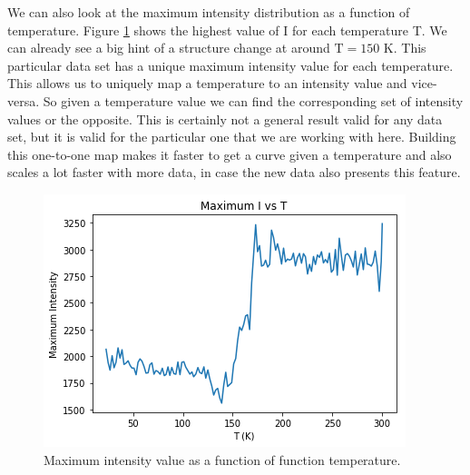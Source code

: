 We can also look at the maximum intensity distribution as a function of temperature. Figure \ref{fig:maxI} shows the highest value of I for each temperature T. We can already see a big hint of a structure change at around $\textrm{T} = 150 \textrm{ K}$. This particular data set has a unique maximum intensity value for each temperature. This allows us to uniquely map a temperature to an intensity value and vice-versa. So given a temperature value we can find the corresponding set of intensity values or the opposite.
This is certainly not a general result valid for any data set, but it is valid for the particular one that we are working with here. Building this one-to-one map makes it faster to get a curve given a temperature and also scales a lot faster with more data, in case the new data also presents this feature.

\begin{figure}[h]
  \centering
  \includegraphics[scale=0.25]{../figs/maxI.png}
  \caption{Maximum intensity value as a function of function temperature.}
  \label{fig:maxI}
\end{figure}